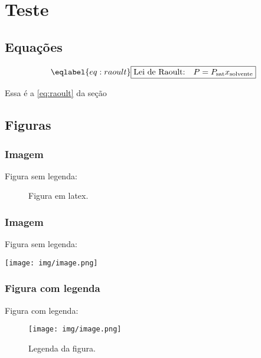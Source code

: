 \section{Teste}\label{teste}

\subsection{Equações}\label{sec:sec1}

\[\eqlabel{eq:raoult} 
    \boxed{
        \text{Lei de Raoult:}
        \quad
        P = P_\text{sat} x_\text{solvente}
    }
\]

Essa é a \eqref{eq:raoult} da seção 

\subsection{Figuras}\label{figuras}

\subsubsection{Imagem}\label{imagem}

Figura sem legenda:

\begin{figure}
\hypertarget{fig:latex}{%
\centering
{}
\caption{Figura em latex.}\label{fig:latex}
}
\end{figure}

\subsubsection{Imagem}\label{imagem-1}

Figura sem legenda:

\texttt{[image: img/image.png]}

\subsubsection{Figura com legenda}\label{figura-com-legenda}

Figura com legenda:

\begin{figure}
\hypertarget{fig:fig1}{%
\centering
\texttt{[image: img/image.png]}
\caption{Legenda da figura.}\label{fig:fig1}
}
\end{figure}

